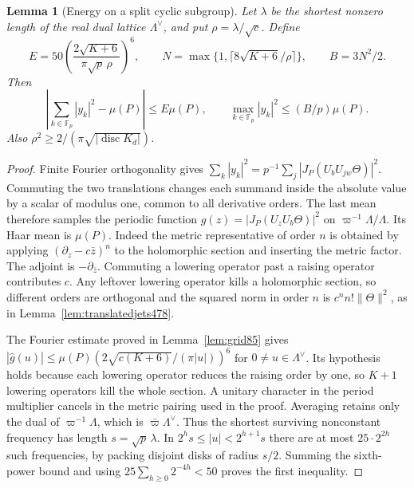 \documentclass[a4paper,11pt]{article}
\newtheorem{lemma}[proposition]{Lemma}
\theoremstyle{definition}
\theoremstyle{remark}
\numberwithin{equation}{section}
\begin{document}
\begin{lemma}[Energy on a split cyclic subgroup]\leavevmode
\label{lem:cyclicsampling518}
Let \(\lambda\) be the shortest nonzero length of the real dual
lattice \(\Lambda^\vee\), and put \(\rho=\lambda/\sqrt c\). Define
\[
 E=50\left(\frac{2\sqrt{K+6}}{\pi\sqrt p\,\rho}\right)^6,
 \qquad N=\max\{1,\lceil8\sqrt{K+6}/\rho\rceil\},
 \qquad B=3N^2/2.
\]
Then
\[
 \left|\sum_{k\in\mathbb F_p}|y_k|^2-\mu(P)\right|
       \le E\mu(P),\qquad
 \max_{k\in\mathbb F_p}|y_k|^2\le (B/p)\mu(P).
\]
Also \(\rho^2\ge 2/(\pi\sqrt{|\operatorname{disc}K_d|})\).
\end{lemma}
\begin{proof}
Finite Fourier orthogonality gives
\(\sum_k|y_k|^2=p^{-1}\sum_j|J_P(U_bU_{jw}\Theta)|^2\).
Commuting the two translations changes each summand inside the
absolute value by a scalar of modulus one, common to all derivative
orders. The last mean therefore samples the periodic function
\(g(z)=|J_P(U_z U_b\Theta)|^2\) on \(\varpi^{-1}\Lambda/\Lambda\).
Its Haar mean is \(\mu(P)\). Indeed the metric representative of
order \(n\) is obtained by applying
\((\partial_z-c\bar z)^n\) to the holomorphic section and inserting
the metric factor. The adjoint is \(-\partial_{\bar z}\).
Commuting a lowering operator past a raising operator contributes
\(c\). Any leftover lowering operator kills a holomorphic section,
so different orders are orthogonal and the squared norm in order
\(n\) is \(c^n n!\|\Theta\|^2\), as in Lemma~\ref{lem:translatedjets478}.

The Fourier estimate proved in Lemma~\ref{lem:grid85} gives
\( |\widehat g(u)|\le\mu(P)(2\sqrt{c(K+6)}/(\pi|u|))^6\) for
\(0\ne u\in\Lambda^\vee\). Its hypothesis holds because each
lowering operator reduces the raising order by one, so \(K+1\)
lowering operators kill the whole section. A unitary character in
the period multiplier cancels in the metric pairing used in the
proof. Averaging retains only the dual of \(\varpi^{-1}\Lambda\),
which is \(\bar\varpi\Lambda^\vee\). Thus the shortest surviving
nonconstant frequency has length \(s=\sqrt p\,\lambda\).
In \(2^h s\le |u|<2^{h+1}s\) there are at most \(25\cdot 2^{2h}\)
such frequencies, by packing disjoint disks of radius \(s/2\).
Summing the sixth-power bound and using
\(25\sum_{h\ge0}2^{-4h}<50\) proves the first inequality.


\end{proof}
\end{document}
